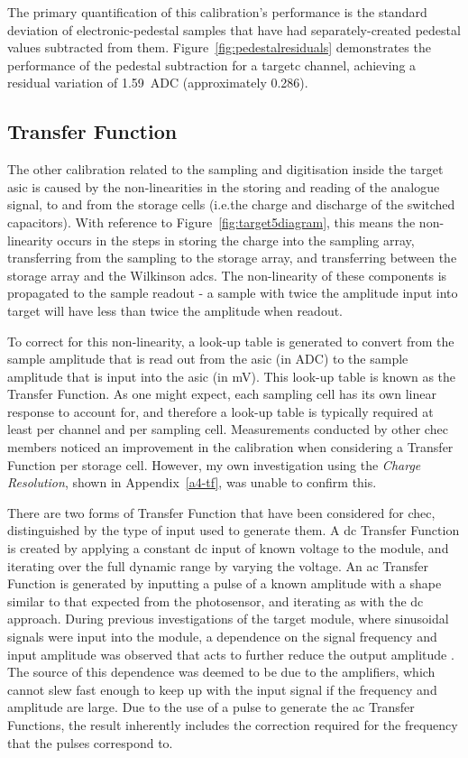 The primary quantification of this calibration's performance is the standard deviation of electronic-pedestal samples that have had separately-created pedestal values subtracted from them. Figure~\ref{fig:pedestalresiduals} demonstrates the performance of the pedestal subtraction for a \gls{targetc} channel, achieving a residual variation of \SI{1.59}{ADC} (approximately \SI{0.286}{\pe}).

\subsection{Transfer Function}

The other calibration related to the sampling and digitisation inside the \gls{target} \gls{asic} is caused by the non-linearities in the storing and reading of the analogue signal, to and from the storage cells (i.e.\@ the charge and discharge of the switched capacitors). With reference to Figure~\ref{fig:target5diagram}, this means the non-linearity occurs in the steps in storing the charge into the sampling array, transferring from the sampling to the storage array, and transferring between the storage array and the Wilkinson \glspl{adc}. The non-linearity of these components is propagated to the sample readout - a sample with twice the amplitude input into \gls{target} will have less than twice the amplitude when readout.

To correct for this non-linearity, a look-up table is generated to convert from the sample amplitude that is read out from the \gls{asic} (in \si{ADC}) to the sample amplitude that is input into the \gls{asic} (in \si{mV}). This look-up table is known as the Transfer Function. As one might expect, each sampling cell has its own linear response to account for, and therefore a look-up table is typically required at least per channel and per sampling cell. Measurements conducted by other \gls{chec} members noticed an improvement in the calibration when considering a Transfer Function per storage cell. However, my own investigation using the \textit{Charge Resolution}, shown in Appendix~\ref{a4-tf}, was unable to confirm this.

There are two forms of Transfer Function that have been considered for \gls{chec}, distinguished by the type of input used to generate them. A \gls{dc} Transfer Function is created by applying a constant \gls{dc} input of known voltage to the module, and iterating over the full dynamic range by varying the voltage. An \gls{ac} Transfer Function is generated by inputting a pulse of a known amplitude with a shape similar to that expected from the photosensor, and iterating as with the \gls{dc} approach. During previous investigations of the \gls{target} module, where sinusoidal signals were input into the module, a dependence on the signal frequency and input amplitude was observed that acts to further reduce the output amplitude \cite{Bechtol2012,Albert2017}. The source of this dependence was deemed to be due to the amplifiers, which cannot slew fast enough to keep up with the input signal if the frequency and amplitude are large. Due to the use of a pulse to generate the \gls{ac} Transfer Functions, the result inherently includes the correction required for the frequency that the pulses correspond to. 

